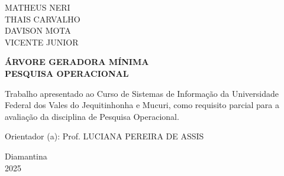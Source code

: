 
\thispagestyle{empty}
\begin{center}

    \normalsize
    \MakeUppercase{Matheus Neri} \\ 
    \MakeUppercase{Thais Carvalho} \\ 
    \MakeUppercase{Davison Mota} \\ 
    \MakeUppercase{Vicente Junior}

    \vspace{6cm}

    \Large\textbf{\MakeUppercase{ÁRVORE GERADORA MÍNIMA}} \\
    \large\textbf{\MakeUppercase{PESQUISA OPERACIONAL}}

    \vfill

    \noindent
    \hfill
    \begin{minipage}{0.65\textwidth}
        \singlespacing%
        
        Trabalho apresentado ao Curso de Sistemas de Informação da Universidade Federal dos Vales do Jequitinhonha e Mucuri, como requisito parcial para a avaliação da disciplina de Pesquisa Operacional.

        \vspace{0.5cm}

        Orientador (a): Prof.\MakeUppercase{ Luciana Pereira de Assis}
    \end{minipage}

    \vfill
    \normalsize
    Diamantina \\
    2025

\end{center}